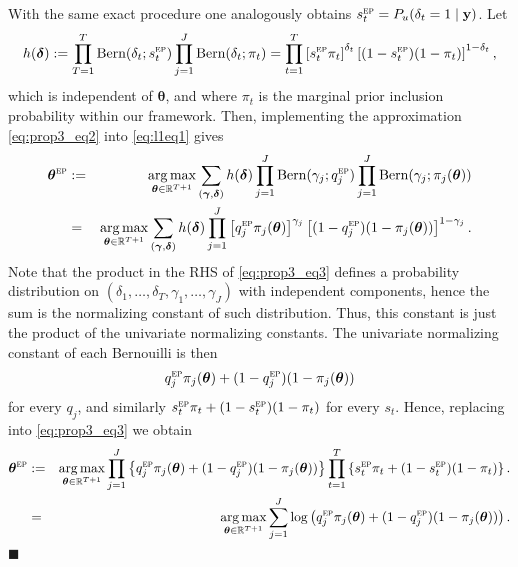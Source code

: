 \documentclass[12pt]{article}
\newcommand{\mb}[1]{\mathbf{#1}}
\DeclareMathOperator*{\argmax}{arg\,max}
\newcommand{\by}{{\mb{y}}}
\newcommand{\bgamma}{{\bm{\gamma}}}
\newcommand{\bdelta}{{\bm{\delta}}}
\newcommand{\btheta}{{\bm{\theta}}}
\newcommand{\bthetaep}{\btheta^{\textsc{ep}}}
\begin{document}
With the same exact procedure one analogously obtains $s_{t}^{\textsc{ep}} = P_{u}(\delta_t = 1 \mid \by)$. Let
\begin{align*}
h(\bdelta) := \prod_{T=1}^{T} \text{Bern}(\delta_t; s_{t}^{\textsc{ep}}) \prod_{j=1}^{J} \text{Bern}(\delta_t; \pi_{t}) = \prod_{t=1}^{T} \left[ s_{t}^{\textsc{ep}} \pi_t \right]^{\delta_t} \left[ (1-s_{t}^{\textsc{ep}}) (1-\pi_t) \right]^{1-\delta_t},
\end{align*}
which is independent of $\btheta$, and where $\pi_{t}$ is the marginal prior inclusion probability within our framework. Then, implementing the approximation \eqref{eq:prop3_eq2} into \eqref{eq:l1eq1} gives
\begin{eqnarray}
\bthetaep &:=& \argmax_{\btheta \in \mathbb{R}^{T+1}} \sum_{(\bgamma, \bdelta)} h(\bdelta) \prod_{j=1}^{J} \text{Bern}(\gamma_j; q_{j}^{\textsc{ep}}) \prod_{j=1}^{J} \text{Bern}(\gamma_j; \pi_j(\btheta)) \nonumber \\
&=& \argmax_{\btheta \in \mathbb{R}^{T+1}} \sum_{(\bgamma, \bdelta)} h(\bdelta) \prod_{j=1}^{J} \left[ q_{j}^{\textsc{ep}} \pi_j(\btheta) \right]^{\gamma_j} \left[ (1-q_{j}^{\textsc{ep}}) (1-\pi_j(\btheta)) \right]^{1-\gamma_j}. \label{eq:prop3_eq3}
\end{eqnarray}
Note that the product in the RHS of \eqref{eq:prop3_eq3} defines a probability distribution on $(\delta_1, \dots, \delta_{T}, \gamma_1, \dots, \gamma_{J})$ with independent components, hence the sum is the normalizing constant of such distribution. Thus, this constant is just the product of the univariate normalizing constants. The univariate normalizing constant of each Bernouilli is then
\begin{align*}
q_{j}^{\textsc{ep}} \pi_j(\btheta) + (1-q_{j}^{\textsc{ep}}) (1-\pi_j(\btheta))
\end{align*}
for every $q_{j}$, and similarly $s_{t}^{\textsc{ep}} \pi_t + (1-s_{t}^{\textsc{ep}}) (1-\pi_t)$ for every $s_{t}$.
Hence, replacing into \eqref{eq:prop3_eq3} we obtain
\begin{eqnarray}
\bthetaep &:=& \argmax_{\btheta \in \mathbb{R}^{T+1}} \prod_{j=1}^{J} \left\{ q_{j}^{\textsc{ep}} \pi_j(\btheta) + (1-q_{j}^{\textsc{ep}}) (1-\pi_j(\btheta)) \right\} \prod_{t=1}^{T} \left\{ s_{t}^{\textsc{ep}} \pi_{t} + (1-s_{t}^{\textsc{ep}}) (1-\pi_{t}) \right\}. \nonumber \\
&=& \argmax_{\btheta \in \mathbb{R}^{T+1}} \sum_{j=1}^{J} \log \left( q_{j}^{\textsc{ep}} \pi_j(\btheta) + (1-q_{j}^{\textsc{ep}}) (1-\pi_j(\btheta)) \right). \nonumber
\end{eqnarray}
\hfill $\blacksquare$
\end{document}
